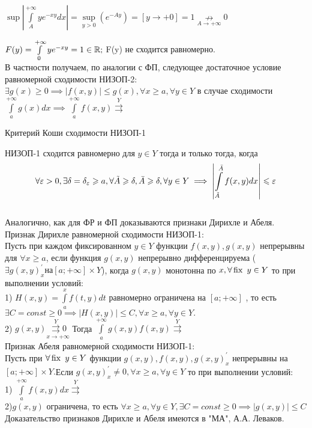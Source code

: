 \documentclass[../../main.tex]{subfiles}
\begin{document}
$\sup\left| \int\limits_A^{+\infty}ye^{-xy}dx \right|=\underset{y > 0}\sup  
\left( e^{-Ay}\right) = \left[y \to +0\right] = 1 \underset{A \to 
+\infty}\nrightarrow 0 $	

$F(y) = \int\limits_0^{+\infty}ye^{-xy} = 1 \in \mathbb{R};$ F(y) не сходится 
равномерно.
\\
В частности получаем, по аналогии с ФП, следующее достаточное условие 
равномерной сходимости НИЗОП-2:
$\exists g(x) \ge 0 \implies \left| f(x,y) \right| \le g(x), \forall x \ge a, 
\forall y \in Y $ в случае сходимости $\int\limits_a^{+\infty}g(x)dx \implies 
\int\limits_a^{+\infty}f(x,y) \overset{Y}\rightrightarrows $
\begin{crl*}Критерий Коши сходимости НИЗОП-1\end{crl*}

НИЗОП-1 сходится равномерно для $ y \in Y$ тогда и только тогда, 
когда\begin{equation}\label{lec10:11} \forall \varepsilon > 0, \exists \delta = 
\delta_\varepsilon \geqslant a, \forall \tilde{A} \geqslant \delta, \bar{A} \geqslant \delta, \forall y 
\in Y \implies \left| \int\limits_{\tilde{A}}^{\bar{A}}f(x,y)dx \right| \leqslant 
\varepsilon \end{equation}
\\
Аналогично, как для ФР и ФП доказываются признаки Дирихле и Абеля.
\\
Признак Дирихле равномерной сходимости НИЗОП-1:
\\
Пусть при каждом фиксированном $y \in Y$ функции $f(x,y),g(x,y)$ непрерывны 
для $\forall x \ge a$, если функция $g(x,y)$ непрерывно дифференцируема 
($\exists g(x,y)_x^\prime на [a;+\infty] \times Y $), когда $g(x,y)$ 
монотонна по $x, \forall \operatorname{fix} \ y \in Y$ то при выполнении условий:
\\
1) $H(x,y) = \int\limits_a^x f(t,y)dt$ равномерно ограничена на $[a;+\infty]$ 
, то  есть $\exists C = const \ge 0 \implies \left|H(x,y)\right| \le C, 
\forall x \ge a, \forall y \in Y.$
\\
2) $g(x,y)\underset{x \to +\infty}{\overset{Y}{\rightrightarrows} 0}$
Тогда $\int\limits_a^{+\infty} g(x,y)f(x,y) \overset{Y}{\rightrightarrows}$
\\
Признак Абеля равномерной сходимости НИЗОП-1:
\\
Пусть при $\forall \operatorname{fix} \ y \in Y $ функции $g(x,y), f(x,y), g(x,y)_x^\prime$ 
непрерывны на $[a;+\infty]\times Y.$Если $ g(x,y)_x^\prime \not = 0, \forall x 
\ge a, \forall y \in Y $ то при выполнении условий:
\\
1) $\int\limits_a^{+\infty}f(x,y)dx \overset{Y}{\rightrightarrows}$
\\
2)$g(x,y)$ ограничена, то есть $\forall x \ge a, \forall y \in Y, \exists C = 
const \ge 0 \implies \left|g(x,y)\right| \le C $
\\
Доказательство признаков Дирихле и Абеля имеются в "МА", А.А. Леваков.
\\
\\
\\
\end{document}
